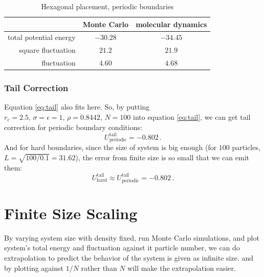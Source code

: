 \documentclass[UTF8,a4paper]{article}
\begin{document}
\begin{table}[H]
	\centering
	\caption{Hexagonal placement, periodic boundaries}
	\begin{tabular}{rcc}
		\toprule
		\toprule
		                       & Monte Carlo & molecular dynamics \\ \midrule
		total potential energy & $-30.28$    & $-34.45$           \\
		square fluctuation     & $21.2$      & $21.9$             \\
		fluctuation            & $4.60$      & $4.68$             \\
		\bottomrule
	\end{tabular}%
	\label{tab:hex_hard_2}%
\end{table}%
\subsubsection{Tail Correction}
Equation \eqref{eq:tail} also fits here. So, by putting $r_c = 2.5, \, \sigma = \epsilon = 1, \,\rho = 0.8442, \,N = 100$ into equation \eqref{eq:tail}, we can 
get tail correction for periodic boundary conditions:
\begin{equation}
	U^{\text{tail}}_{\text{periodic}} = -0.802\,.
\end{equation}
And for hard boundaries, since the size of system is big enough (for $100$ particles, $L = \sqrt{100/0.1} = 31.62$), the error from finite size is so small that we can 
emit them:
\begin{equation}
	U^{\text{tail}}_{\text{hard}} \approx U^{\text{tail}}_{\text{periodic}} = -0.802\,.
\end{equation}

\section{Finite Size Scaling}
By varying system size with density fixed, run Monte Carlo simulations, and plot system's total energy and fluctuation against it particle number, we can 
do extrapolation to predict the behavior of the system is given as infinite size. and by plotting against $1/N$ rather than $N$ will make the extrapolation 
easier.
\end{document}
